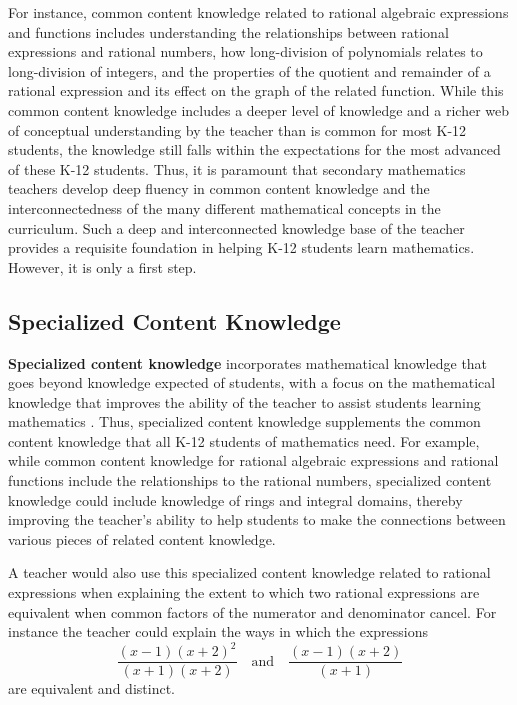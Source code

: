 \documentclass[
]{book}
\theoremstyle{definition}
\theoremstyle{definition}
\theoremstyle{definition}
\theoremstyle{definition}
\theoremstyle{remark}
\begin{document}
For instance, common content knowledge related to rational algebraic expressions and functions includes understanding the relationships between rational expressions and rational numbers, how long-division of polynomials relates to long-division of integers, and the properties of the quotient and remainder of a rational expression and its effect on the graph of the related function. While this common content knowledge includes a deeper level of knowledge and a richer web of conceptual understanding by the teacher than is common for most K-12 students, the knowledge still falls within the expectations for the most advanced of these K-12 students. Thus, it is paramount that secondary mathematics teachers develop deep fluency in common content knowledge and the interconnectedness of the many different mathematical concepts in the curriculum. Such a deep and interconnected knowledge base of the teacher provides a requisite foundation in helping K-12 students learn mathematics. However, it is only a first step.

\hypertarget{specialized-content-knowledge}{%
\subsection{Specialized Content Knowledge}\label{specialized-content-knowledge}}

\textbf{Specialized content knowledge} incorporates mathematical knowledge that goes beyond knowledge expected of students, with a focus on the mathematical knowledge that improves the ability of the teacher to assist students learning mathematics \citep[p.~400]{Ball2008}. Thus, specialized content knowledge supplements the common content knowledge that all K-12 students of mathematics need. For example, while common content knowledge for rational algebraic expressions and rational functions include the relationships to the rational numbers, specialized content knowledge could include knowledge of rings and integral domains, thereby improving the teacher's ability to help students to make the connections between various pieces of related content knowledge.

A teacher would also use this specialized content knowledge related to rational expressions when explaining the extent to which two rational expressions are equivalent when common factors of the numerator and denominator cancel. For instance the teacher could explain the ways in which the expressions
\[ \frac{(x-1)(x+2)^2}{(x+1)(x+2)} \quad \mbox{and} \quad \frac{(x-1)(x+2)}{(x+1)}\] are equivalent and distinct.
\end{document}
